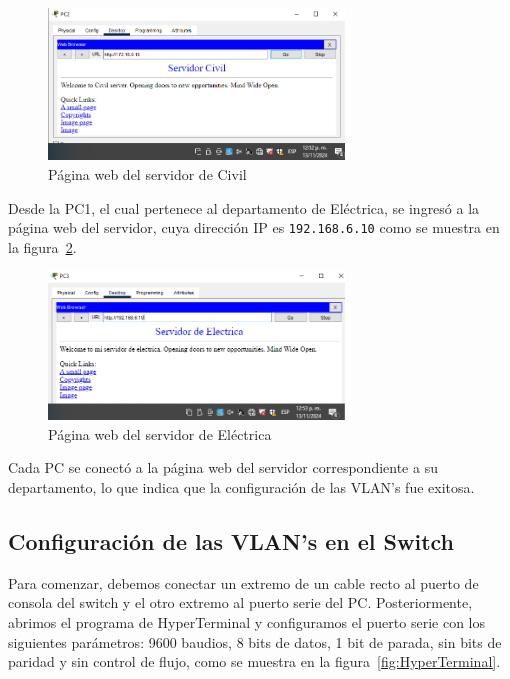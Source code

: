         \begin{figure}[H]
            \centering
            \includegraphics[width=0.7\textwidth]{img/ServerCivil.PNG}
            \caption{Página web del servidor de Civil}
            \label{fig:servidorCivil}
        \end{figure}

        Desde la PC1, el cual pertenece al departamento de Eléctrica, se ingresó a la página web del servidor, cuya dirección IP es \texttt{192.168.6.10} como se muestra en la figura~\ref{fig:servidorElectrica}.

        \begin{figure}[H]
            \centering
            \includegraphics[width=0.7\textwidth]{img/serverElectrica.PNG}
            \caption{Página web del servidor de Eléctrica}
            \label{fig:servidorElectrica}
        \end{figure}

        Cada PC se conectó a la página web del servidor correspondiente a su departamento, lo que indica que la configuración de las VLAN's fue exitosa.



    \subsection{Configuración de las VLAN's en el Switch}
        Para comenzar, debemos conectar un extremo de un cable recto al puerto de consola del switch y el otro extremo al puerto serie del PC. Posteriormente, abrimos el programa de HyperTerminal y configuramos el puerto serie con los siguientes parámetros: 9600 baudios, 8 bits de datos, 1 bit de parada, sin bits de paridad y sin control de flujo, como se muestra en la figura~\ref{fig:HyperTerminal}.

